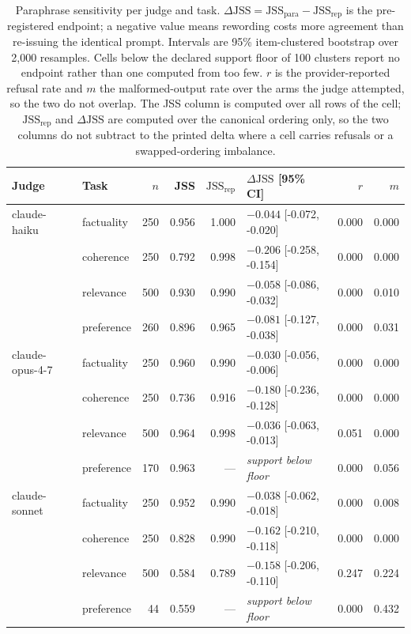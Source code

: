 \documentclass[11pt]{article}          %
\begin{document}
\begin{table}[t]
\centering
\caption{Paraphrase sensitivity per judge and task. $\Delta\mathrm{JSS} = \mathrm{JSS}_{\text{para}} - \mathrm{JSS}_{\text{rep}}$ is the pre-registered endpoint; a negative value means rewording costs more agreement than re-issuing the identical prompt. Intervals are 95\% item-clustered bootstrap over 2{,}000 resamples. Cells below the declared support floor of 100 clusters report no endpoint rather than one computed from too few. $r$ is the provider-reported refusal rate and $m$ the malformed-output rate over the arms the judge attempted, so the two do not overlap. The JSS column is computed over all rows of the cell; $\mathrm{JSS}_{\text{rep}}$ and $\Delta\mathrm{JSS}$ are computed over the canonical ordering only, so the two columns do not subtract to the printed delta where a cell carries refusals or a swapped-ordering imbalance.}
\label{tab:main}
\begin{tabular}{llrrrlrr}
\toprule
Judge & Task & $n$ & JSS & $\mathrm{JSS}_{\text{rep}}$ & $\Delta\mathrm{JSS}$ [95\% CI] & $r$ & $m$ \\
\midrule
claude-haiku & factuality & 250 & 0.956 & 1.000 & $-0.044$ [-0.072, -0.020] & 0.000 & 0.000 \\
 & coherence & 250 & 0.792 & 0.998 & $-0.206$ [-0.258, -0.154] & 0.000 & 0.000 \\
 & relevance & 500 & 0.930 & 0.990 & $-0.058$ [-0.086, -0.032] & 0.000 & 0.010 \\
 & preference & 260 & 0.896 & 0.965 & $-0.081$ [-0.127, -0.038] & 0.000 & 0.031 \\
\addlinespace
claude-opus-4-7 & factuality & 250 & 0.960 & 0.990 & $-0.030$ [-0.056, -0.006] & 0.000 & 0.000 \\
 & coherence & 250 & 0.736 & 0.916 & $-0.180$ [-0.236, -0.128] & 0.000 & 0.000 \\
 & relevance & 500 & 0.964 & 0.998 & $-0.036$ [-0.063, -0.013] & 0.051 & 0.000 \\
 & preference & 170 & 0.963 & --- & \emph{support below floor} & 0.000 & 0.056 \\
\addlinespace
claude-sonnet & factuality & 250 & 0.952 & 0.990 & $-0.038$ [-0.062, -0.018] & 0.000 & 0.008 \\
 & coherence & 250 & 0.828 & 0.990 & $-0.162$ [-0.210, -0.118] & 0.000 & 0.000 \\
 & relevance & 500 & 0.584 & 0.789 & $-0.158$ [-0.206, -0.110] & 0.247 & 0.224 \\
 & preference & 44 & 0.559 & --- & \emph{support below floor} & 0.000 & 0.432 \\
\bottomrule
\end{tabular}
\end{table}
\end{document}
